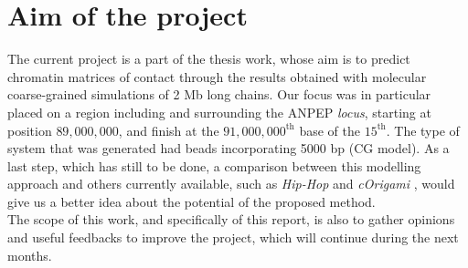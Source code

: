 \section{Aim of the project} \label{chap: aim}

The current project is a part of the thesis work, whose aim is to predict chromatin matrices of contact through the results obtained with molecular coarse-grained simulations of 2 Mb long chains. Our focus was in particular placed on a region including and surrounding the ANPEP \textit{locus}, starting at position $89,000,000$, and finish at the $91,000,000^{\text{th}}$ base of the $15^\text{th}$. The type of system that was generated had beads incorporating 5000 bp (CG model).
As a last step, which has still to be done, a comparison between this modelling approach and others currently available, such as \textit{Hip-Hop} and \textit{cOrigami}
\cite{bucklePolymerSimulationsHeteromorphic2018,tanCelltypespecificPrediction3D2023},
would give us a better idea about the potential of the proposed method.\\
The scope of this work, and specifically of this report, is also to gather opinions and useful feedbacks to improve the project, which will continue during the next months.

